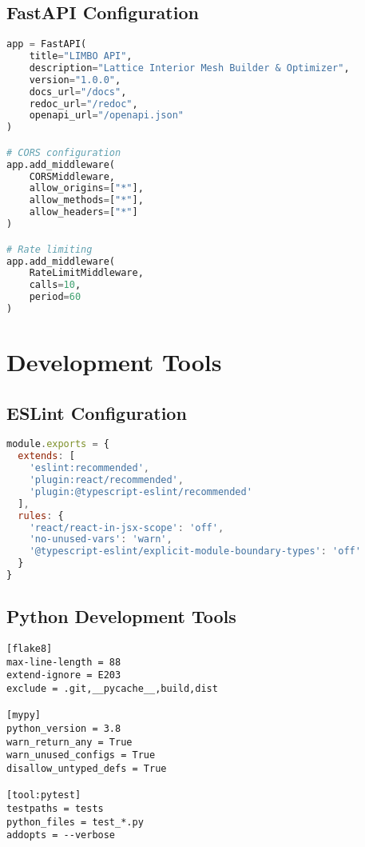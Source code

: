 \subsection{FastAPI Configuration}
\begin{tcolorbox}[title=main.py]
\begin{lstlisting}[language=python]
app = FastAPI(
    title="LIMBO API",
    description="Lattice Interior Mesh Builder & Optimizer",
    version="1.0.0",
    docs_url="/docs",
    redoc_url="/redoc",
    openapi_url="/openapi.json"
)

# CORS configuration
app.add_middleware(
    CORSMiddleware,
    allow_origins=["*"],
    allow_methods=["*"],
    allow_headers=["*"]
)

# Rate limiting
app.add_middleware(
    RateLimitMiddleware,
    calls=10,
    period=60
)
\end{lstlisting}
\end{tcolorbox}

\section{Development Tools}
\subsection{ESLint Configuration}
\begin{tcolorbox}[title=.eslintrc.js]
\begin{lstlisting}[language=javascript]
module.exports = {
  extends: [
    'eslint:recommended',
    'plugin:react/recommended',
    'plugin:@typescript-eslint/recommended'
  ],
  rules: {
    'react/react-in-jsx-scope': 'off',
    'no-unused-vars': 'warn',
    '@typescript-eslint/explicit-module-boundary-types': 'off'
  }
}
\end{lstlisting}
\end{tcolorbox}

\subsection{Python Development Tools}
\begin{tcolorbox}[title=setup.cfg]
\begin{lstlisting}
[flake8]
max-line-length = 88
extend-ignore = E203
exclude = .git,__pycache__,build,dist

[mypy]
python_version = 3.8
warn_return_any = True
warn_unused_configs = True
disallow_untyped_defs = True

[tool:pytest]
testpaths = tests
python_files = test_*.py
addopts = --verbose
\end{lstlisting}
\end{tcolorbox}

